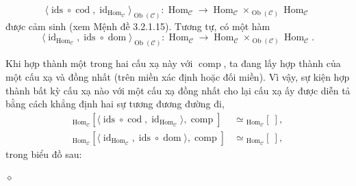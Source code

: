 \begin{enumerate}[label=\alph*.]
\[\langle\operatorname{ids}\circ\operatorname{cod},\operatorname{id}_{\operatorname{Hom}_{\mathcal C}}\rangle_{\operatorname{Ob}(\mathcal C)}:\operatorname{Hom}_{\mathcal C}\longrightarrow\operatorname{Hom}_{\mathcal C}\times_{\operatorname{Ob}(\mathcal C)}\operatorname{Hom}_{\mathcal C}\]
được cảm sinh (xem Mệnh đề 3.2.1.15). Tương tự, có một hàm
\[\langle\operatorname{id}_{\operatorname{Hom}_{\mathcal C}},\operatorname{ids}\circ\operatorname{dom}\rangle_{\operatorname{Ob}(\mathcal C)}:\operatorname{Hom}_{\mathcal C}\longrightarrow\operatorname{Hom}_{\mathcal C}\times_{\operatorname{Ob}(\mathcal C)}\operatorname{Hom}_{\mathcal C}.\]

Khi hợp thành một trong hai cấu xạ này với $\operatorname{comp}$, ta đang lấy hợp thành của một cấu xạ và đồng nhất (trên miền xác định hoặc đối miền). Vì vậy, sự kiện hợp thành bất kỳ cấu xạ nào với một cấu xạ đồng nhất cho lại cấu xạ ấy được diễn tả bằng cách khẳng định hai sự tương đương đường đi,
\begin{align*}
{}_{\operatorname{Hom}_{\mathcal C}}[\langle\operatorname{ids}\circ\operatorname{cod},\operatorname{id}_{\operatorname{Hom}_{\mathcal C}}\rangle,\operatorname{comp}]&\simeq{}_{\operatorname{Hom}_{\mathcal C}}[\ ],\\
{}_{\operatorname{Hom}_{\mathcal C}}[\langle\operatorname{id}_{\operatorname{Hom}_{\mathcal C}},\operatorname{ids}\circ\operatorname{dom}\rangle,\operatorname{comp}]&\simeq{}_{\operatorname{Hom}_{\mathcal C}}[\ ],
\end{align*}
trong biểu đồ sau:
\begin{center}\end{center}
\end{enumerate}\hfill$\diamond$
